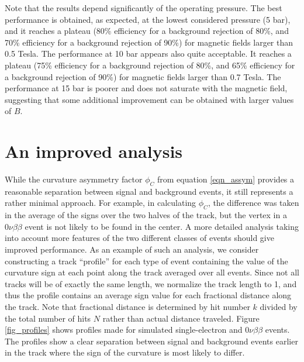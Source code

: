 \documentclass{JINST}
\begin{document}
Note that the results depend significantly of the operating pressure. The best performance is obtained, as expected, at the lowest considered pressure (5 bar), and it reaches a plateau (80\% efficiency for a background rejection of 80\%, and 70\% efficiency for a background rejection of 90\%) for magnetic fields larger than 0.5 Tesla. The performance at 10 bar appears also quite acceptable. It reaches a plateau (75\% efficiency for a background rejection of 80\%, and 65\% efficiency for a background rejection of 90\%) for magnetic fields larger than 0.7 Tesla. The performance at 15 bar is poorer and does not saturate with the magnetic field, suggesting that some additional improvement can be obtained with larger values of $B$. 

\section{An improved analysis}\label{sec.improvedanalysis}
While the curvature asymmetry factor $\phi_C$ from equation \ref{eqn_assym} provides a reasonable separation between signal and background events, it still represents a rather minimal approach.  For example, in calculating $\phi_C$, the difference was taken in the average of the signs over the two halves of the track, but the vertex in a $0\nu\beta\beta$ event is not likely to be found in the center.  A more detailed analysis taking into account more features of the two different classes of events should give improved performance.  As an example of such an analysis, we consider constructing a track ``profile'' for each type of event containing the value of the curvature sign at each point along the track averaged over all events.  Since not all tracks will be of exactly the same length, we normalize the track length to 1, and thus the profile contains an average sign value for each fractional distance along the track.  Note that fractional distance is determined by hit number $k$ divided by the total number of hits $N$ rather than actual distance traveled.  Figure \ref{fig_profiles} shows profiles made for simulated single-electron and $0\nu\beta\beta$ events.  The profiles show a clear separation between signal and background events earlier in the track where the sign of the curvature is most likely to differ.
\end{document}
